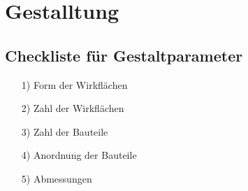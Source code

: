 \section{Gestalltung}


\subsection*{Checkliste für Gestaltparameter}

\begin{itemize}
	\item[1)] Form der Wirkflächen
	\item[2)] Zahl der Wirkflächen
	\item[3)] Zahl der Bauteile
	\item[4)] Anordnung der Bauteile
	\item[5)] Abmessungen	
\end{itemize}








